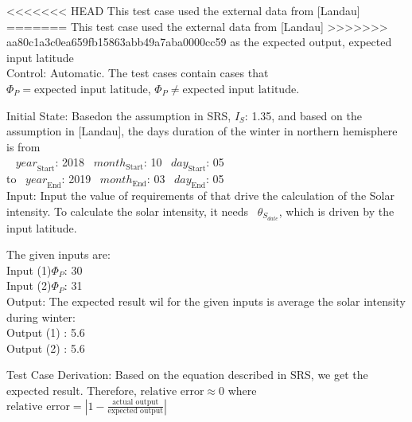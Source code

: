 \documentclass[12pt, titlepage]{article}
\begin{document}
\begin{enumerate}
<<<<<<< HEAD
This test case used the external data from [Landau]\cite{Charles2001}
=======
This test case used the external data from [Landau\cite{Charles2001}] 
>>>>>>> aa80c1a3c0ea659fb15863abb49a7aba0000cc59
as the expected output, expected input latitude\\

Control: Automatic. The test cases contain cases that $\Phi_P = \text{expected
input latitude}$, $\Phi_P \ne \text{expected input latitude}$. 

Initial State:
Basedon the assumption in SRS\cite{YS2019}, $I_{S}$: 1.35, and based on the
assumption in [Landau]\cite{Charles2001}, the days duration of the winter in
northern hemisphere is from\\
~ $\mathit{year}_\text{Start}$: 2018
~$\mathit{month}_\text{Start}$: 10 
~$\mathit{day}_\text{Start}$: 05 \\
 to
~$\mathit{year}_\text{End}$: 2019 
~$\mathit{month}_\text{End}$: 03
~$\mathit{day}_\text{End}$: 05\\

Input: Input the value of requirements of
\progname that drive the calculation of the Solar intensity. To calculate the
solar intensity, it needs ~$\theta_{S_{date}}$, which is driven by the input
latitude.

The given inputs are:\\ 
Input (1)$\Phi_P$: 30 \\ 
Input (2)$\Phi_P$: 31\\

Output: The expected result wil for the given inputs is average the solar
intensity during winter:\\ 
Output (1) : 5.6\\ 
Output (2) : 5.6\\



Test Case Derivation: Based on the equation described in SRS\cite{YS2019}, we
get the expected result. Therefore, $\text{relative error} \approx 0$ where
$\text{relative error} = | 1 - \frac{\text{actual output}}{ \text{expected
output}} |$ 


\end{enumerate}
\end{document}
